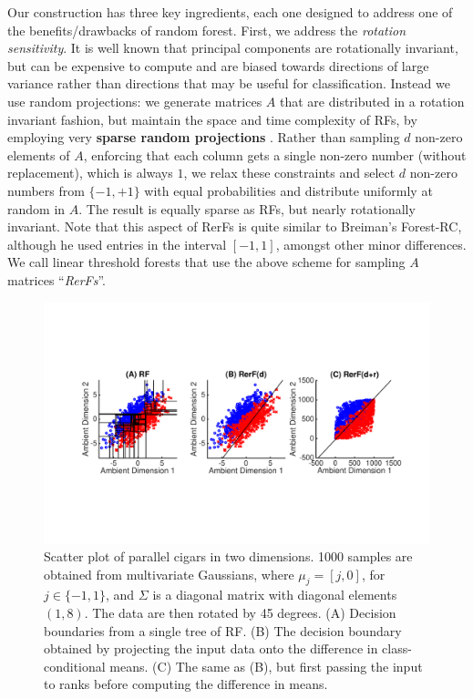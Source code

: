 \documentclass{article} %
\begin{document}
Our construction has three key ingredients, each one designed to address one of the benefits/drawbacks of random forest.
First, we address the {\em{rotation sensitivity}}.  It is well known that principal components are rotationally invariant, but can be expensive to compute and are biased towards directions of large variance rather than directions that may be useful for classification. Instead we use random projections: we generate matrices $A$ that are distributed in a rotation invariant fashion, but maintain the space and time complexity of RFs, by employing very {\bf{sparse random projections}} \cite{Li2006}.  Rather than sampling $d$ non-zero elements of $A$, enforcing that each column gets a single non-zero number (without replacement), which is always $1$, we relax these constraints and select $d$ non-zero numbers from $\{-1,+1\}$ with equal probabilities and distribute uniformly at random in $A$. The result is equally sparse as RFs, but nearly rotationally invariant.  Note that this aspect of RerFs is quite similar to Breiman's Forest-RC, although he used entries in the interval $[-1,1]$, amongst other minor differences. We call linear threshold forests that use the above scheme for sampling $A$ matrices ``\emph{RerFs}''.  



\begin{figure}[h]
\begin{center}
\includegraphics[trim=0in 3.2in 0in 3in, clip=true, width=\linewidth]{../Figures/pdf/Cigars}
\end{center}
\caption{Scatter plot of parallel cigars in two dimensions. 1000 samples are obtained from multivariate Gaussians, where $\mu_j=[j, 0]$, for $j \in \{-1,1\}$, and $\Sigma$ is a diagonal matrix with diagonal elements $(1,8)$.  The data are then rotated by 45 degrees. (A) Decision boundaries from a single tree of RF. (B) The decision boundary obtained by projecting the input data onto the difference in class-conditional means. (C) The same as (B), but first passing the input to ranks before computing the difference in means.}
\label{fig:cigars}
\end{figure}
\end{document}
